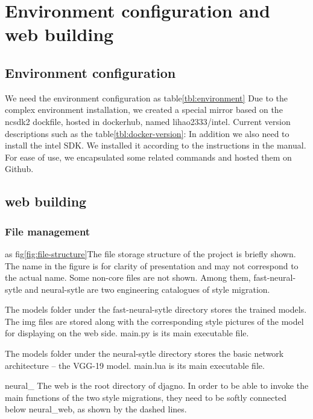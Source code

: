 \section{Environment configuration and web building}
\subsection{Environment configuration}
We need the environment configuration as table\ref{tbl:environment}
Due to the complex environment installation, we created a special mirror based on the ncsdk2 dockfile, hosted in dockerhub, named lihao2333/intel.
Current version descriptions such as the table\ref{tbl:docker-version}:
In addition we also need to install the intel SDK. We installed it according to the instructions in the manual. For ease of use, we encapsulated some related commands and hosted them on Github.\cite{rcClub}
\subsection{web building}
\subsubsection{File management}
as fig\ref{fig:file-structure}The file storage structure of the project is briefly shown. The name in the figure is for clarity of presentation and may not correspond to the actual name. Some non-core files are not shown.
Among them, fast-neural-sytle and neural-sytle are two engineering catalogues of style migration.

The models folder under the fast-neural-sytle directory stores the trained models. The img files are stored along with the corresponding style pictures of the model for displaying on the web side. main.py is its main executable file.

The models folder under the neural-sytle directory stores the basic network architecture -- the VGG-19 model. main.lua is its main executable file.

neural\_
The web is the root directory of djagno. In order to be able to invoke the main functions of the two style migrations, they need to be softly connected below neural\_web, as shown by the dashed lines.

